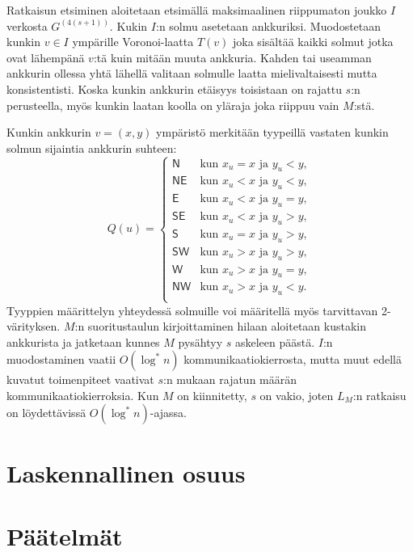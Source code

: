 \documentclass[12pt,finnish]{tktltiki2}
\theoremstyle{definition}
\theoremstyle{remark}
\begin{document}
Ratkaisun etsiminen aloitetaan etsimällä maksimaalinen riippumaton joukko $I$ verkosta $G^{(4(s+1))}$. Kukin $I$:n solmu asetetaan ankkuriksi. Muodostetaan kunkin $v \in I$ ympärille Voronoi-laatta $T(v)$ joka sisältää kaikki solmut jotka ovat lähempänä $v$:tä kuin mitään muuta ankkuria. Kahden tai useamman ankkurin ollessa yhtä lähellä valitaan solmulle laatta mielivaltaisesti mutta konsistentisti. Koska kunkin ankkurin etäisyys toisistaan on rajattu $s$:n perusteella, myös kunkin laatan koolla on yläraja joka riippuu vain $M$:stä.

Kunkin ankkurin $v = (x, y)$ ympäristö merkitään tyypeillä vastaten kunkin solmun sijaintia ankkurin suhteen:
\[
 Q(u) = 
  \begin{cases} 
   \mathsf{N} & \text{kun } x_u = x \text{ ja } y_u < y, \\
   \mathsf{NE} & \text{kun } x_u < x \text{ ja } y_u < y, \\
   \mathsf{E} & \text{kun } x_u < x \text{ ja } y_u = y, \\
   \mathsf{SE} & \text{kun } x_u < x \text{ ja } y_u > y, \\
   \mathsf{S} & \text{kun } x_u = x \text{ ja } y_u > y, \\
   \mathsf{SW} & \text{kun } x_u > x \text{ ja } y_u > y, \\
   \mathsf{W} & \text{kun } x_u > x \text{ ja } y_u = y, \\
   \mathsf{NW} & \text{kun } x_u > x \text{ ja } y_u < y. \\
  \end{cases}
\]
Tyyppien määrittelyn yhteydessä solmuille voi määritellä myös tarvittavan 2-värityksen. $M$:n suoritustaulun kirjoittaminen hilaan aloitetaan kustakin ankkurista ja jatketaan kunnes $M$ pysähtyy $s$ askeleen päästä. $I$:n muodostaminen vaatii $O(\log^* n)$ kommunikaatiokierrosta, mutta muut edellä kuvatut toimenpiteet vaativat $s$:n mukaan rajatun määrän kommunikaatiokierroksia. Kun $M$ on kiinnitetty, $s$ on vakio, joten $L_M$:n ratkaisu on löydettävissä $O(\log^* n)$-ajassa.


\section{Laskennallinen osuus}


\section{Päätelmät}
\end{document}
